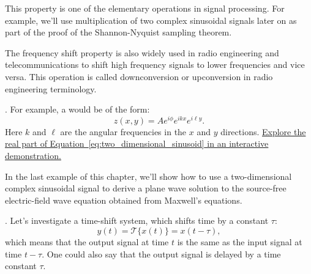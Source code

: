 This property is one of the elementary operations in signal
processing. For example, we'll use multiplication of two complex sinusoidal
signals later on as part of the proof of the Shannon-Nyquist sampling theorem.

The frequency shift property is also widely used in radio engineering and
telecommunications to shift high frequency signals to lower frequencies and vice versa.
This operation is called downconversion or upconversion in radio engineering terminology.

.
For example, a  would be of the form:
\begin{equation}
  z(x,y) = A e^{i\phi} e^{i k x} e^{i \ell y}.
  \label{eq:two_dimensional_sinusoid}
\end{equation}
Here $k$ and $\ell$ are the angular frequencies in the $x$ and $y$ directions.
\href{https://juha.no/signal/2d-sinusoid/}{Explore the real part of Equation~\ref{eq:two_dimensional_sinusoid} in an interactive demonstration.}

In the last example of this chapter, we'll show how to use a two-dimensional
complex sinusoidal signal to derive a plane wave solution to the source-free
electric-field wave equation obtained from Maxwell's equations.

.
Let's investigate a time-shift system, which shifts time by a constant $\tau$:
\begin{equation}
  y(t) = \mathcal{T}\{x(t)\} = x(t-\tau),
\end{equation}
which means that the output signal at time $t$ is the same as the input signal at
time $t-\tau$. One could also say that the output signal is delayed by a time constant $\tau$.

